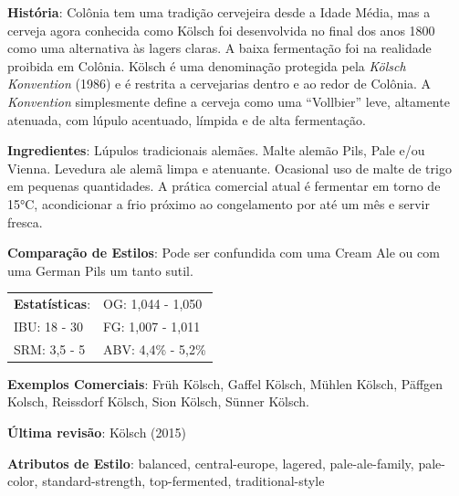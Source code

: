 \textbf{História}: Colônia tem uma tradição cervejeira desde a Idade Média, mas a cerveja agora conhecida como Kölsch foi desenvolvida no final dos anos 1800 como uma alternativa às lagers claras. A baixa fermentação foi na realidade proibida em Colônia. Kölsch é uma denominação protegida pela \textit{Kölsch Konvention} (1986) e é restrita a cervejarias dentro e ao redor de Colônia. A \textit{Konvention} simplesmente define a cerveja como uma “Vollbier” leve, altamente atenuada, com lúpulo acentuado, límpida e de alta fermentação.

\textbf{Ingredientes}: Lúpulos tradicionais alemães. Malte alemão Pils, Pale e/ou Vienna. Levedura ale alemã limpa e atenuante. Ocasional uso de malte de trigo em pequenas quantidades. A prática comercial atual é fermentar em torno de 15°C, acondicionar a frio próximo ao congelamento por até um mês e servir fresca.

\textbf{Comparação de Estilos}: Pode ser confundida com uma Cream Ale ou com uma German Pils um tanto sutil.

\begin{tabular}{@{}p{35mm}p{35mm}@{}}
  \textbf{Estatísticas}: & OG: 1,044 - 1,050 \\
  IBU: 18 - 30  & FG: 1,007 - 1,011  \\
  SRM: 3,5 - 5  & ABV: 4,4\% - 5,2\%
\end{tabular}

\textbf{Exemplos Comerciais}: Früh Kölsch, Gaffel Kölsch, Mühlen Kölsch, Päffgen Kolsch, Reissdorf Kölsch, Sion Kölsch, Sünner Kölsch.

\textbf{Última revisão}: Kölsch (2015)

\textbf{Atributos de Estilo}: balanced, central-europe, lagered, pale-ale-family, pale-color, standard-strength, top-fermented, traditional-style
